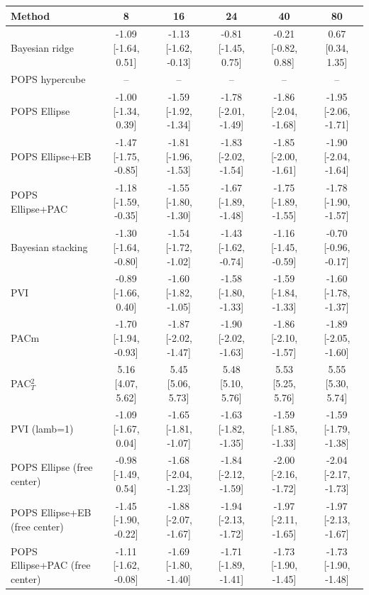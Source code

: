 \begin{tabular}{lccccc}
\toprule
Method & 8 & 16 & 24 & 40 & 80 \\
\midrule
Bayesian ridge & -1.09 {\scriptsize[-1.64, 0.51]} & -1.13 {\scriptsize[-1.62, -0.13]} & -0.81 {\scriptsize[-1.45, 0.75]} & -0.21 {\scriptsize[-0.82, 0.88]} & 0.67 {\scriptsize[0.34, 1.35]} \\
POPS hypercube & -- & -- & -- & -- & -- \\
POPS Ellipse & -1.00 {\scriptsize[-1.34, 0.39]} & -1.59 {\scriptsize[-1.92, -1.34]} & -1.78 {\scriptsize[-2.01, -1.49]} & -1.86 {\scriptsize[-2.04, -1.68]} & -1.95 {\scriptsize[-2.06, -1.71]} \\
POPS Ellipse+EB & -1.47 {\scriptsize[-1.75, -0.85]} & -1.81 {\scriptsize[-1.96, -1.53]} & -1.83 {\scriptsize[-2.02, -1.54]} & -1.85 {\scriptsize[-2.00, -1.61]} & -1.90 {\scriptsize[-2.04, -1.64]} \\
POPS Ellipse+PAC & -1.18 {\scriptsize[-1.59, -0.35]} & -1.55 {\scriptsize[-1.80, -1.30]} & -1.67 {\scriptsize[-1.89, -1.48]} & -1.75 {\scriptsize[-1.89, -1.55]} & -1.78 {\scriptsize[-1.90, -1.57]} \\
Bayesian stacking & -1.30 {\scriptsize[-1.64, -0.80]} & -1.54 {\scriptsize[-1.72, -1.02]} & -1.43 {\scriptsize[-1.62, -0.74]} & -1.16 {\scriptsize[-1.45, -0.59]} & -0.70 {\scriptsize[-0.96, -0.17]} \\
PVI & -0.89 {\scriptsize[-1.66, 0.40]} & -1.60 {\scriptsize[-1.82, -1.05]} & -1.58 {\scriptsize[-1.80, -1.33]} & -1.59 {\scriptsize[-1.84, -1.33]} & -1.60 {\scriptsize[-1.78, -1.37]} \\
PACm & -1.70 {\scriptsize[-1.94, -0.93]} & -1.87 {\scriptsize[-2.02, -1.47]} & -1.90 {\scriptsize[-2.02, -1.63]} & -1.86 {\scriptsize[-2.10, -1.57]} & -1.89 {\scriptsize[-2.05, -1.60]} \\
PAC$^2_T$ & 5.16 {\scriptsize[4.07, 5.62]} & 5.45 {\scriptsize[5.06, 5.73]} & 5.48 {\scriptsize[5.10, 5.76]} & 5.53 {\scriptsize[5.25, 5.76]} & 5.55 {\scriptsize[5.30, 5.74]} \\
PVI (lamb=1) & -1.09 {\scriptsize[-1.67, 0.04]} & -1.65 {\scriptsize[-1.81, -1.07]} & -1.63 {\scriptsize[-1.82, -1.35]} & -1.59 {\scriptsize[-1.85, -1.33]} & -1.59 {\scriptsize[-1.79, -1.38]} \\
POPS Ellipse (free center) & -0.98 {\scriptsize[-1.49, 0.54]} & -1.68 {\scriptsize[-2.04, -1.23]} & -1.84 {\scriptsize[-2.12, -1.59]} & -2.00 {\scriptsize[-2.16, -1.72]} & -2.04 {\scriptsize[-2.17, -1.73]} \\
POPS Ellipse+EB (free center) & -1.45 {\scriptsize[-1.90, -0.22]} & -1.88 {\scriptsize[-2.07, -1.67]} & -1.94 {\scriptsize[-2.13, -1.72]} & -1.97 {\scriptsize[-2.11, -1.65]} & -1.97 {\scriptsize[-2.13, -1.67]} \\
POPS Ellipse+PAC (free center) & -1.11 {\scriptsize[-1.62, -0.08]} & -1.69 {\scriptsize[-1.80, -1.40]} & -1.71 {\scriptsize[-1.89, -1.41]} & -1.73 {\scriptsize[-1.90, -1.45]} & -1.73 {\scriptsize[-1.90, -1.48]} \\
\bottomrule
\end{tabular}

